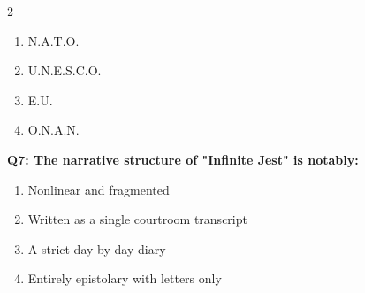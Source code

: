 \documentclass[10pt]{article}
\begin{document}
\begin{multicols}{2}
\begin{enumerate}[label=\arabic*.]
\item N.A.T.O.
\item U.N.E.S.C.O.
\item E.U.
\item O.N.A.N.
\end{enumerate}
\textbf{Q7: The narrative structure of "Infinite Jest" is notably:}

\begin{enumerate}[label=\arabic*.]
\item Nonlinear and fragmented
\item Written as a single courtroom transcript
\item A strict day-by-day diary
\item Entirely epistolary with letters only
\end{enumerate}
\end{multicols}

\newpage
\end{document}

